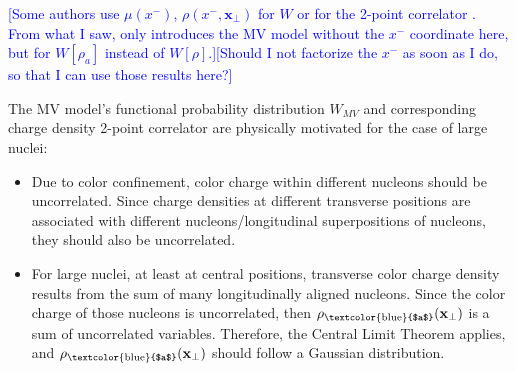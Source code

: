 
\textcolor{blue}{[Some authors use $\mu(x^-)$, $\rho(x^-, \mathbf{x}_\perp)$ for $W$ \cite{Albacete_2014} or for the 2-point correlator \cite{Lappi_notes}. From what I saw, only \cite{Gelis_Habilitation} introduces the MV model without the $x^-$ coordinate here, but for $W[\rho_a]$ instead of $W[\rho]$.][Should I not factorize the $x^-$ as soon as I do, so that I can use those results here?]}

The \gls{MV} model's functional probability distribution $W_{MV}$ and corresponding charge density 2-point correlator are physically motivated for the case of large nuclei: \cite{Gelis_habilitation}
\begin{itemize}
	\item[1)] Due to color confinement, color charge within different nucleons should be uncorrelated. Since charge densities at different transverse positions are associated with different nucleons/longitudinal superpositions of nucleons, they should also be uncorrelated.
	\item[2)] For large nuclei, at least at central positions, transverse color charge density results from the sum of many longitudinally aligned nucleons. Since the color charge of those nucleons is uncorrelated, then $\rho_\text{\textcolor{blue}{$a$}}(\mathbf{x}_\perp)$ is a sum of uncorrelated variables. Therefore, the Central Limit Theorem applies, and $\rho_\text{\textcolor{blue}{$a$}}(\mathbf{x}_\perp)$ should follow a Gaussian distribution.
\end{itemize}









